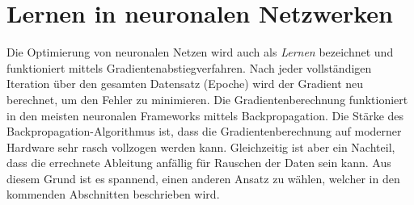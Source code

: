 %
%
%
\section{Lernen in neuronalen Netzwerken
\label{ableitung:section:problemstellung}}
Die Optimierung von neuronalen Netzen wird auch als {\em Lernen}
bezeichnet und funktioniert mittels Gradientenabstiegverfahren.
%
Nach jeder vollständigen Iteration über den gesamten Datensatz (Epoche) wird der Gradient neu berechnet, um den Fehler zu minimieren.
%
Die Gradientenberechnung funktioniert in den meisten neuronalen Frameworks mittels Backpropagation.
%
Die Stärke des Backpropagation-Algorithmus ist, dass die Gradientenberechnung auf moderner Hardware sehr rasch vollzogen werden kann.
Gleichzeitig ist aber ein Nachteil, dass die errechnete Ableitung anfällig für Rauschen der Daten sein kann.
Aus diesem Grund ist es spannend, einen anderen Ansatz zu wählen, welcher in den kommenden Abschnitten beschrieben wird.

